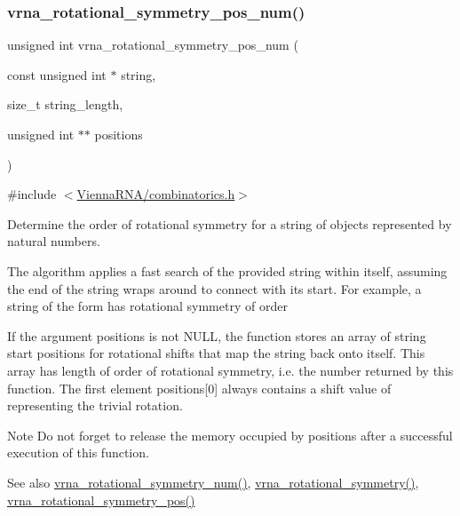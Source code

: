 \subsubsection{\texorpdfstring{vrna\+\_\+rotational\+\_\+symmetry\+\_\+pos\+\_\+num()}{vrna\_rotational\_symmetry\_pos\_num()}}
{\footnotesize\ttfamily unsigned int vrna\+\_\+rotational\+\_\+symmetry\+\_\+pos\+\_\+num (\begin{DoxyParamCaption}\item[{const unsigned int $\ast$}]{string,  }\item[{size\+\_\+t}]{string\+\_\+length,  }\item[{unsigned int $\ast$$\ast$}]{positions }\end{DoxyParamCaption})}



{\ttfamily \#include $<$\hyperlink{combinatorics_8h}{Vienna\+R\+N\+A/combinatorics.\+h}$>$}



Determine the order of rotational symmetry for a string of objects represented by natural numbers. 

The algorithm applies a fast search of the provided string within itself, assuming the end of the string wraps around to connect with it\textquotesingle{}s start. For example, a string of the form {} has rotational symmetry of order {} 

If the argument {\ttfamily positions} is not {\ttfamily N\+U\+LL}, the function stores an array of string start positions for rotational shifts that map the string back onto itself. This array has length of order of rotational symmetry, i.\+e. the number returned by this function. The first element {\ttfamily positions}\mbox{[}0\mbox{]} always contains a shift value of {} representing the trivial rotation.

\begin{DoxyNote}{Note}
Do not forget to release the memory occupied by {\ttfamily positions} after a successful execution of this function.
\end{DoxyNote}
\begin{DoxySeeAlso}{See also}
\hyperlink{group__combinatorics__utils_gac51464b5281833a58c25f9447252c495}{vrna\+\_\+rotational\+\_\+symmetry\+\_\+num()}, \hyperlink{group__combinatorics__utils_gae1dec02c4b63f303ce06a9293d316762}{vrna\+\_\+rotational\+\_\+symmetry()}, \hyperlink{group__combinatorics__utils_ga294d48935fcac87ab335d771fe289ecb}{vrna\+\_\+rotational\+\_\+symmetry\+\_\+pos()}
\end{DoxySeeAlso}

